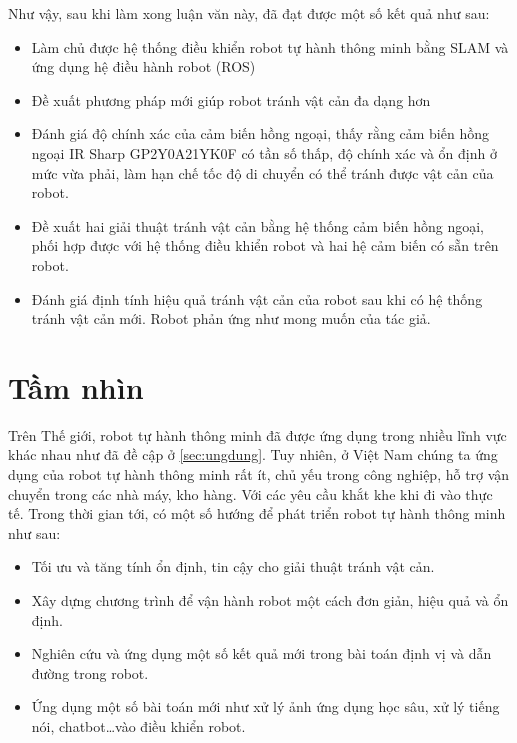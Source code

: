 Như vậy, sau khi làm xong luận văn này, đã đạt được một số kết quả như sau:
\begin{itemize}
    \item Làm chủ được hệ thống điều khiển robot tự hành thông minh bằng SLAM và ứng dụng hệ điều hành robot (ROS)
    \item Đề xuất phương pháp mới giúp robot tránh vật cản đa dạng hơn
    \item Đánh giá độ chính xác của cảm biến hồng ngoại, thấy rằng cảm biến hồng ngoại IR Sharp GP2Y0A21YK0F có tần số thấp, độ chính xác và ổn định ở mức vừa phải, làm hạn chế tốc độ di chuyển có thể tránh được vật cản của robot.
    \item Đề xuất hai giải thuật tránh vật cản bằng hệ thống cảm biến hồng ngoại, phối hợp được với hệ thống điều khiển robot và hai hệ cảm biến có sẵn trên robot.
    \item Đánh giá định tính hiệu quả tránh vật cản của robot sau khi có hệ thống tránh vật cản mới. Robot phản ứng như mong muốn của tác giả.
\end{itemize}

\section{Tầm nhìn}
Trên Thế giới, robot tự hành thông minh đã được ứng dụng trong nhiều lĩnh vực khác nhau như đã đề cập ở \ref{sec:ungdung}. Tuy nhiên, ở Việt Nam chúng ta ứng dụng của robot tự hành thông minh rất ít, chủ yếu trong công nghiệp, hỗ trợ vận chuyển trong các nhà máy, kho hàng. Với các yêu cầu khắt khe khi đi vào thực tế. Trong thời gian tới, có một số hướng để phát triển robot tự hành thông minh như sau:
\begin{itemize}
    \item Tối ưu và tăng tính ổn định, tin cậy cho giải thuật tránh vật cản.
    \item Xây dựng chương trình để vận hành robot một cách đơn giản, hiệu quả và ổn định.
    \item Nghiên cứu và ứng dụng một số kết quả mới trong bài toán định vị và dẫn đường trong robot.
    \item Ứng dụng một số bài toán mới như xử lý ảnh ứng dụng học sâu, xử lý tiếng nói, chatbot\dots vào điều khiển robot.
\end{itemize}



